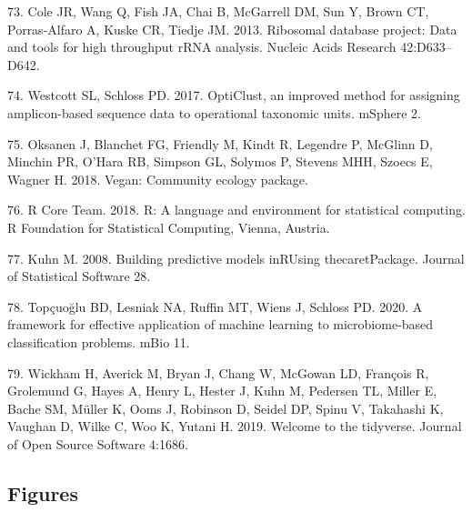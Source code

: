 \documentclass[
  11pt,
]{article}
\begin{document}
\leavevmode\hypertarget{ref-Cole2013}{}%
73. Cole JR, Wang Q, Fish JA, Chai B, McGarrell DM, Sun Y, Brown CT,
Porras-Alfaro A, Kuske CR, Tiedje JM. 2013. Ribosomal database project:
Data and tools for high throughput rRNA analysis. Nucleic Acids Research
42:D633--D642.

\leavevmode\hypertarget{ref-Westcott2017}{}%
74. Westcott SL, Schloss PD. 2017. OptiClust, an improved method for
assigning amplicon-based sequence data to operational taxonomic units.
mSphere 2.

\leavevmode\hypertarget{ref-Vegan2018}{}%
75. Oksanen J, Blanchet FG, Friendly M, Kindt R, Legendre P, McGlinn D,
Minchin PR, O'Hara RB, Simpson GL, Solymos P, Stevens MHH, Szoecs E,
Wagner H. 2018. Vegan: Community ecology package.

\leavevmode\hypertarget{ref-r_citation_2018}{}%
76. R Core Team. 2018. R: A language and environment for statistical
computing. R Foundation for Statistical Computing, Vienna, Austria.

\leavevmode\hypertarget{ref-Kuhn2008}{}%
77. Kuhn M. 2008. Building predictive models inRUsing thecaretPackage.
Journal of Statistical Software 28.

\leavevmode\hypertarget{ref-Topcuoglu2020}{}%
78. Topçuoğlu BD, Lesniak NA, Ruffin MT, Wiens J, Schloss PD. 2020. A
framework for effective application of machine learning to
microbiome-based classification problems. mBio 11.

\leavevmode\hypertarget{ref-Tidyverse2019}{}%
79. Wickham H, Averick M, Bryan J, Chang W, McGowan LD, François R,
Grolemund G, Hayes A, Henry L, Hester J, Kuhn M, Pedersen TL, Miller E,
Bache SM, Müller K, Ooms J, Robinson D, Seidel DP, Spinu V, Takahashi K,
Vaughan D, Wilke C, Woo K, Yutani H. 2019. Welcome to the tidyverse.
Journal of Open Source Software 4:1686.

\newpage

\hypertarget{figures}{%
\subsection{Figures}\label{figures}}
\end{document}
